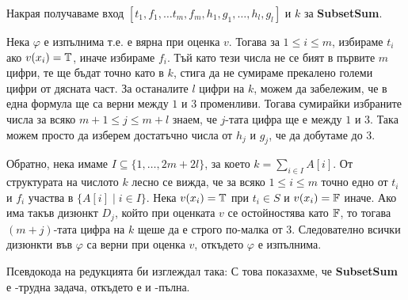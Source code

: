 Накрая получаваме вход $[t_1, f_1, \dots t_m, f_m, h_1, g_1, \dots, h_l, g_l]$ и $k$ за \textbf{SubsetSum}.

Нека $\varphi$ е изпълнима т.е. е вярна при оценка $v$.
Тогава за $1 \leq i \leq m$, избираме $t_i$ ако $v(x_i) = \mathbb{T}$, иначе избираме $f_i$.
Тъй като тези числа не се бият в първите $m$ цифри, те ще бъдат точно като в $k$, стига да не сумираме прекалено големи цифри от дясната част.
За останалите $l$ цифри на $k$, можем да забележим, че в една формула ще са верни между $1$ и $3$ променливи.
Тогава сумирайки избраните числа за всяко $m + 1 \leq j \leq m + l$ знаем, че $j$-тата цифра ще е между $1$ и $3$.
Така можем просто да изберем достатъчно числа от $h_j$ и $g_j$, че да добутаме до $3$.

Обратно, нека имаме $I \subseteq \{ 1, \dots, 2m + 2l \}$, за което $k = \sum\limits_{i \in I} A[i]$.
От структурата на числото $k$ лесно се вижда, че за всяко $1 \leq i \leq m$ точно едно от $t_i$ и $f_i$ участва в $\{ A[i] \mid i \in I \}$.
Нека $v(x_i) = \mathbb{T}$ при $t_i \in S$ и $v(x_i) = \mathbb{F}$ иначе.
Ако има такъв дизюнкт $D_j$, който при оценката $v$ се остойностява като $\mathbb{F}$, то тогава $(m + j)$-тата цифра на $k$ щеше да е строго по-малка от $3$.
Следователно всички дизюнкти във $\varphi$ са верни при оценка $v$, откъдето $\varphi$ е изпълнима.

Псевдокода на редукцията би изглеждал така:
С това показахме, че \textbf{SubsetSum} е \NP-трудна задача, откъдето е и \NP-пълна.